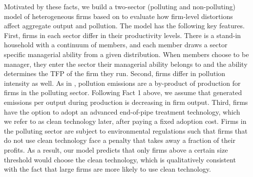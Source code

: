 \documentclass[AEJ]{AEA}
\begin{document}
Motivated by these facts, we build a two-sector (polluting and non-polluting) model of heterogeneous firms based on \citet{Lucas:1978b} to evaluate how firm-level distortions affect aggregate output and pollution. The model has the following key features. First, firms in each sector differ in their productivity levels. There is a stand-in household with a continuum of members, and each member draws a sector specific managerial ability from a given distribution. When members choose to be manager, they enter the sector their managerial ability belongs to and the ability determines the TFP of the firm they run. Second, firms differ in pollution intensity as well. As in \citet{CopelandTaylor:1994}, pollution emissions are a by-product of production for firms in the polluting sector. Following Fact 1 above, we assume that generated emissions per output during production is decreasing in firm output. Third, firms have the option to adopt an advanced end-of-pipe treatment technology, which we refer to as clean technology later, after paying a fixed adoption cost. Firms in the polluting sector are subject to environmental regulations such that firms that do not use clean technology face a penalty that takes away a fraction of their profits. As a result, our model predicts that only firms above a certain size threshold would choose the clean technology, which is qualitatively consistent with the fact that large firms are more likely to use clean technology.
\end{document}
